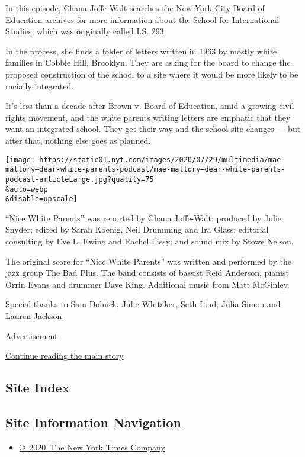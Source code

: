 In this episode, Chana Joffe-Walt searches the New York City Board of
Education archives for more information about the School for
International Studies, which was originally called I.S. 293.

In the process, she finds a folder of letters written in 1963 by mostly
white families in Cobble Hill, Brooklyn. They are asking for the board
to change the proposed construction of the school to a site where it
would be more likely to be racially integrated.

It's less than a decade after Brown v. Board of Education, amid a
growing civil rights movement, and the white parents writing letters are
emphatic that they want an integrated school. They get their way and the
school site changes --- but after that, nothing else goes as planned.

\texttt{[image: https://static01.nyt.com/images/2020/07/29/multimedia/mae-mallory--dear-white-parents-podcast/mae-mallory--dear-white-parents-podcast-articleLarge.jpg?quality=75\\\&auto=webp\\\&disable=upscale]}

``Nice White Parents'' was reported by Chana Joffe-Walt; produced by
Julie Snyder; edited by Sarah Koenig, Neil Drumming and Ira Glass;
editorial consulting by Eve L. Ewing and Rachel Lissy; and sound mix by
Stowe Nelson.

The original score for ``Nice White Parents'' was written and performed
by the jazz group The Bad Plus. The band consists of bassist Reid
Anderson, pianist Orrin Evans and drummer Dave King. Additional music
from Matt McGinley.

Special thanks to Sam Dolnick, Julie Whitaker, Seth Lind, Julia Simon
and Lauren Jackson.

Advertisement

\protect\hyperlink{after-bottom}{Continue reading the main story}

\hypertarget{site-index}{%
\subsection{Site Index}\label{site-index}}

\hypertarget{site-information-navigation}{%
\subsection{Site Information
Navigation}\label{site-information-navigation}}

\begin{itemize}
\tightlist
\item
  \href{https://help.nytimes.com/hc/en-us/articles/115014792127-Copyright-notice}{©~2020~The
  New York Times Company}
\end{itemize}

